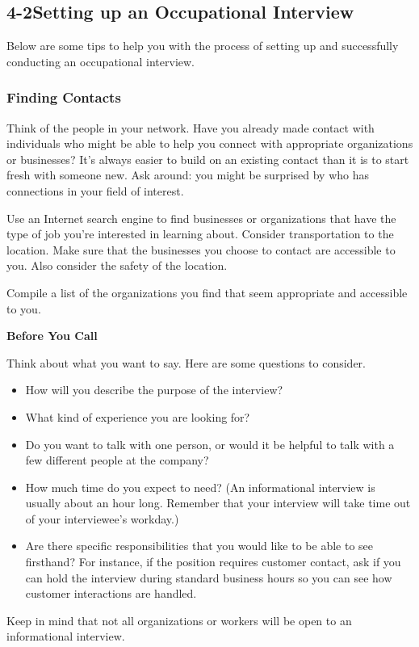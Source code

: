 \pagebreak \subsection*{4-2\quad  Setting up an Occupational Interview}
Below are some tips to help you with the process of setting up and successfully conducting an occupational interview.

\subsubsection*{Finding Contacts}

Think of the people in your network. Have you already made contact with individuals who might be able to help you connect with appropriate organizations or businesses? It's always easier to build on an existing contact than it is to start fresh with someone new. Ask around: you might be surprised by who has connections in your field of interest.

Use an Internet search engine to find businesses or organizations that have the type of job you're interested in learning about. Consider transportation to the location. Make sure that the businesses you choose to contact are accessible to you. Also consider the safety of the location.

Compile a list of the organizations you find that seem appropriate and accessible to you.

\textbf{Before You Call}

Think about what you want to say. Here are some questions to consider.
\begin{itemize}[leftmargin=*]
\item How will you describe the purpose of the interview?
\item What kind of experience you are looking for?
\item Do you want to talk with one person, or would it be helpful to talk with a few different people at the company?
\item How much time do you expect to need? (An informational interview is usually about an hour long. Remember that your interview will take time out of your interviewee's workday.)
\item Are there specific responsibilities that you would like to be able to see firsthand? For instance, if the position requires customer contact, ask if you can hold the interview during standard business hours so you can see how customer interactions are handled.
\end{itemize}
Keep in mind that not all organizations or workers will be open to an informational interview.

